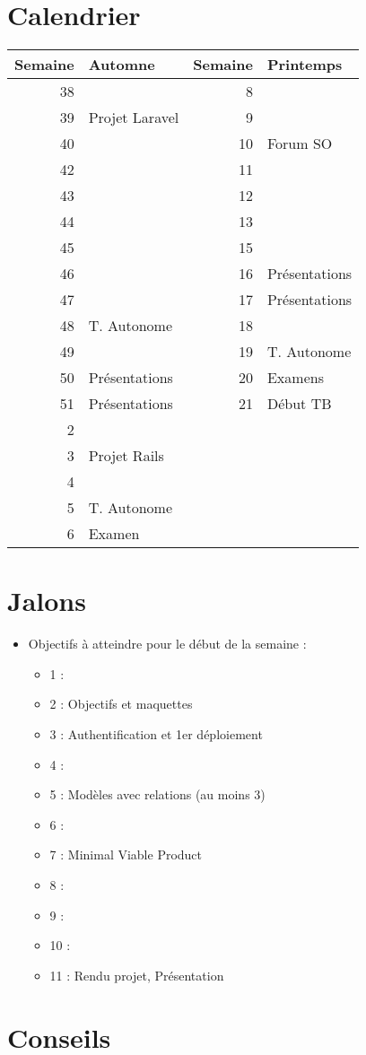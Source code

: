 \hypertarget{calendrier}{%
\section{Calendrier}\label{calendrier}}

\begin{longtable}[]{@{}rlrl@{}}
\toprule
Semaine & Automne & Semaine & Printemps\tabularnewline
\midrule
\endhead
38 & & 8 &\tabularnewline
39 & Projet Laravel & 9 &\tabularnewline
40 & & 10 & Forum SO\tabularnewline
42 & & 11 &\tabularnewline
43 & & 12 &\tabularnewline
44 & & 13 &\tabularnewline
45 & & 15 &\tabularnewline
46 & & 16 & Présentations\tabularnewline
47 & & 17 & Présentations\tabularnewline
48 & T. Autonome & 18 &\tabularnewline
49 & & 19 & T. Autonome\tabularnewline
50 & Présentations & 20 & Examens\tabularnewline
51 & Présentations & 21 & Début TB\tabularnewline
2 & & &\tabularnewline
3 & Projet Rails & &\tabularnewline
4 & & &\tabularnewline
5 & T. Autonome & &\tabularnewline
6 & Examen & &\tabularnewline
\bottomrule
\end{longtable}

\hypertarget{jalons}{%
\section{Jalons}\label{jalons}}

\begin{itemize}
\tightlist
\item
  Objectifs à atteindre pour le début de la semaine :

  \begin{itemize}
  \tightlist
  \item
    1 :
  \item
    2 : Objectifs et maquettes
  \item
    3 : Authentification et 1er déploiement
  \item
    4 :
  \item
    5 : Modèles avec relations (au moins 3)
  \item
    6 :
  \item
    7 : Minimal Viable Product
  \item
    8 :
  \item
    9 :
  \item
    10 :
  \item
    11 : Rendu projet, Présentation
  \end{itemize}
\end{itemize}

\hypertarget{conseils}{%
\section{Conseils}\label{conseils}}

